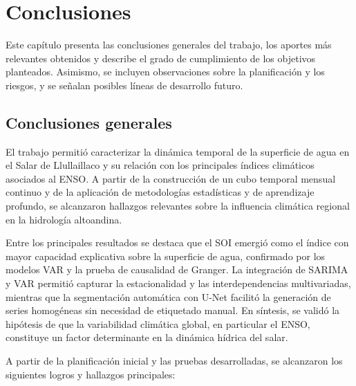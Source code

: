 
\chapter{Conclusiones} %

\label{Chapter5} %
Este capítulo presenta las conclusiones generales del trabajo, los aportes más relevantes obtenidos y describe el grado de cumplimiento de los objetivos planteados. Asimismo, se incluyen observaciones sobre la planificación y los riesgos, y se señalan posibles líneas de desarrollo futuro. 


\section{Conclusiones generales }
El trabajo permitió caracterizar la dinámica temporal de la superficie de agua en el Salar de Llullaillaco y su relación con los principales índices climáticos asociados al ENSO. A partir de la construcción de un cubo temporal mensual continuo y de la aplicación de metodologías estadísticas y de aprendizaje profundo, se alcanzaron hallazgos relevantes sobre la influencia climática regional en la hidrología altoandina. 

Entre los principales resultados se destaca que el SOI emergió como el índice con mayor capacidad explicativa sobre la superficie de agua, confirmado por los modelos VAR y la prueba de causalidad de Granger. La integración de SARIMA y VAR permitió capturar la estacionalidad y las interdependencias multivariadas, mientras que la segmentación automática con U-Net facilitó la generación de series homogéneas sin necesidad de etiquetado manual. En síntesis, se validó la hipótesis de que la variabilidad climática global, en particular el ENSO, constituye un factor determinante en la dinámica hídrica del salar.


A partir de la planificación inicial y las pruebas desarrolladas, se alcanzaron los siguientes logros y hallazgos principales:

